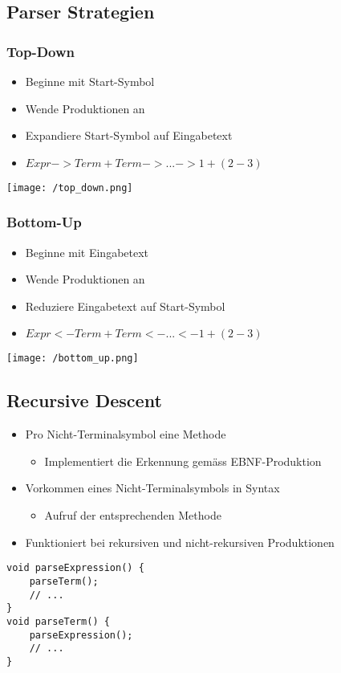 \subsection{Parser Strategien}
\subsubsection{Top-Down}
\begin{itemize}
    \item Beginne mit Start-Symbol
    \item Wende Produktionen an
    \item Expandiere Start-Symbol auf Eingabetext
    \item $Expr -> Term + Term -> ... -> 1 + (2 - 3)$
\end{itemize}
\texttt{[image: /top\_down.png]} 

\subsubsection{Bottom-Up}
\begin{itemize}
    \item Beginne mit Eingabetext
    \item Wende Produktionen an
    \item Reduziere Eingabetext auf Start-Symbol
    \item $Expr <- Term + Term <- ... <- 1 + (2 - 3)$
\end{itemize}
\texttt{[image: /bottom\_up.png]} 

\subsection{Recursive Descent}
\begin{itemize}
    \item Pro Nicht-Terminalsymbol eine Methode
    \begin{itemize}
        \item Implementiert die Erkennung gemäss EBNF-Produktion
    \end{itemize}
    \item Vorkommen eines Nicht-Terminalsymbols in Syntax
    \begin{itemize}
        \item Aufruf der entsprechenden Methode
    \end{itemize}
    \item Funktioniert bei rekursiven und nicht-rekursiven Produktionen
\end{itemize}
\begin{lstlisting}
void parseExpression() {
    parseTerm();
    // ...
}
void parseTerm() {
    parseExpression();
    // ...
}
\end{lstlisting}

